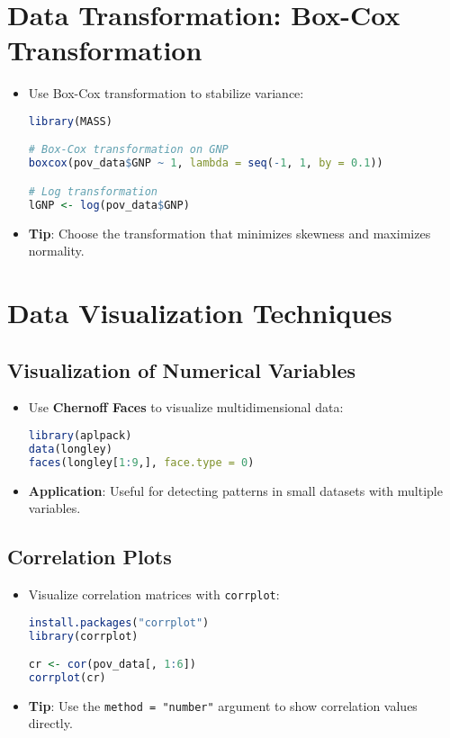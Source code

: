 \documentclass{article}
\begin{document}
\section{Data Transformation: Box-Cox Transformation}
\begin{itemize}
    \item Use Box-Cox transformation to stabilize variance:
\begin{lstlisting}[language=R]
library(MASS)

# Box-Cox transformation on GNP
boxcox(pov_data$GNP ~ 1, lambda = seq(-1, 1, by = 0.1))

# Log transformation
lGNP <- log(pov_data$GNP)
\end{lstlisting}

\item \textbf{Tip}: Choose the transformation that minimizes skewness and maximizes normality.
\end{itemize}

\section{Data Visualization Techniques}
\subsection{Visualization of Numerical Variables}
\begin{itemize}
    \item Use \textbf{Chernoff Faces} to visualize multidimensional data:
\begin{lstlisting}[language=R]
library(aplpack)
data(longley)
faces(longley[1:9,], face.type = 0)
\end{lstlisting}

\item \textbf{Application}: Useful for detecting patterns in small datasets with multiple variables.
\end{itemize}

\subsection{Correlation Plots}
\begin{itemize}
    \item Visualize correlation matrices with \texttt{corrplot}:
\begin{lstlisting}[language=R]
install.packages("corrplot")
library(corrplot)

cr <- cor(pov_data[, 1:6])
corrplot(cr)
\end{lstlisting}

\item \textbf{Tip}: Use the \texttt{method = "number"} argument to show correlation values directly.
\end{itemize}
\end{document}
